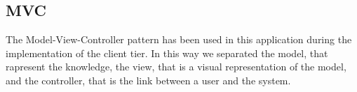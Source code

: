 \subsection{MVC}
	The Model-View-Controller pattern has been used in this application during the implementation of the client tier. In this way we separated the model, that rapresent the knowledge, the view, that is a visual representation of the model, and the controller, that is the link between a user and the system.
